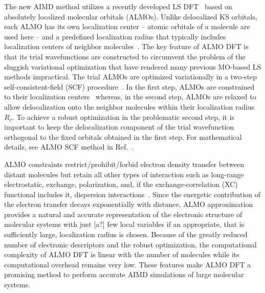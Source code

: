 \documentclass[aps,prl,reprint,amsmath,amssymb]{revtex4-1}
\begin{document}
The new AIMD method utilizes a recently developed LS DFT~\cite{a:almo-ls} based on absolutely localized molecular orbitals (\mbox{ALMOs}). 
Unlike delocalized KS orbitals, each \mbox{ALMO} has its own localization center -- atomic orbitals of a molecule are used here -- and a predefined localization radius that typically includes localization centers of neighbor molecules~\cite{a:stoll,a:almo-ls}. 
The key feature of ALMO DFT is that its trial wavefunctions are constructed to circumvent the problem of the sluggish variational optimization that have rendered many previous MO-based LS methods impractical. 
The trial ALMOs are optimized variationally in a two-step self-consistent-field (SCF) procedure~\cite{a:almo-ls}. 
In the first step, ALMOs are constrained to their localization centers~\cite{a:khal} whereas, in the second step, ALMOs are relaxed to allow delocalization onto the neighbor molecules within their localization radius $R_{c}$. 
To achieve a robust optimization in the problematic second step, it is important to keep the delocalization component of the trial wavefunction orthogonal to the fixed orbitals obtained in the first step. 
For mathematical details, see ALMO SCF method in Ref.~.

ALMO constraints restrict/prohibit/forbid electron density transfer between distant molecules but retain all other types of interaction such as long-range electrostatic, exchange, polarization, and, if the exchange-correlation (XC) functional includes it, dispersion interactions~\cite{a:theeda}. 
Since the energetic contribution of the electron transfer decays exponentially with distance, \mbox{ALMO} approximation provides a natural and accurate representation of the electronic structure of molecular systems with just [a?] few local variables if an appropriate, that is sufficiently large, localization radius is chosen. 
Because of the greatly reduced number of electronic descriptors and the robust optimization, the computational complexity of ALMO DFT is linear with the number of molecules while its computational overhead remains very low. These features make ALMO DFT a promising method to perform accurate AIMD simulations of large molecular systems.
\end{document}
